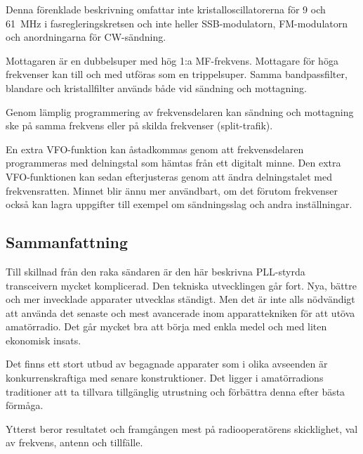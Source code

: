 Denna förenklade beskrivning omfattar inte kristalloscillatorerna för
9 och 61~MHz i fasregleringskretsen och inte heller SSB-modulatorn,
FM-modulatorn och anordningarna för CW-sändning.

Mottagaren är en dubbelsuper med hög 1:a MF-frekvens.
Mottagare för höga frekvenser kan till och med utföras som en trippelsuper.
Samma bandpassfilter, blandare och kristallfilter används både vid sändning
och mottagning.

Genom lämplig programmering av frekvensdelaren kan sändning och
mottagning ske på samma frekvens eller på skilda frekvenser
(split-trafik).

En extra VFO-funktion kan åstadkommas genom att frekvensdelaren
programmeras med delningstal som hämtas från ett digitalt minne.
Den extra VFO-funktionen kan sedan efterjusteras genom att ändra
delningstalet med frekvensratten.
Minnet blir ännu mer användbart, om det förutom frekvenser också kan lagra
uppgifter till exempel om sändningsslag och andra inställningar.

\subsection{Sammanfattning}

Till skillnad från den raka sändaren är den här beskrivna PLL-styrda
transceivern mycket komplicerad.
Den tekniska utvecklingen går fort.
Nya, bättre och mer invecklade apparater utvecklas ständigt.
Men det är inte alls nödvändigt att använda det senaste och mest
avancerade inom apparattekniken för att utöva amatörradio.
Det går mycket bra att börja med enkla medel och med liten ekonomisk insats.

Det finns ett stort utbud av begagnade apparater som i olika avseenden
är konkurrenskraftiga med senare konstruktioner.
Det ligger i amatörradions traditioner att ta tillvara tillgänglig
utrustning och förbättra denna efter bästa förmåga.

Ytterst beror resultatet och framgången mest på radiooperatörens
skicklighet, val av frekvens, antenn och tillfälle.
